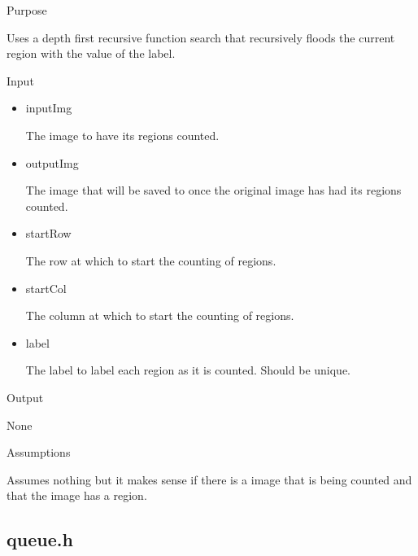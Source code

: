 \documentclass[pdftex, 11pt]{article}
\begin{document}
\begin{description}
		\begin{description}
			\item{Purpose}

				Uses a depth first recursive function search
				that recursively floods the current region with
				the value of the label.

			\item{Input}

				\begin{itemize}

					\item{inputImg}

						The image to have its regions
						counted.

					\item{outputImg}

						The image that will be saved to
						once the original image has had
						its regions counted.

					\item{startRow}

						The row at which to start the
						counting of regions.

					\item{startCol}

						The column at which to start the
						counting of regions.

					\item{label}

						The label to label each region
						as it is counted. Should be
						unique.
				

				\end{itemize}

			\item{Output}

				None

			\item{Assumptions}

				Assumes nothing but it makes sense if there is a
				image that is being counted and that the image
				has a region.


		\end{description}



\end{description}

\subsection{queue.h}
\end{document}
